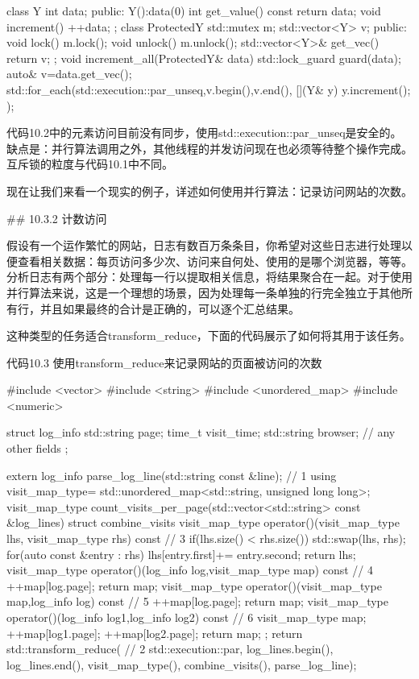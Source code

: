 \begin{cpp}
class Y{
  int data;
public:
  Y():data(0){}
  int get_value() const{
    return data;
  }
  void increment(){
    ++data;
  }
};
class ProtectedY{
  std::mutex m;
  std::vector<Y> v;
public:
  void lock(){
    m.lock();
  }
  void unlock(){
    m.unlock();
  }
  std::vector<Y>& get_vec(){
    return v;
  }
};
void increment_all(ProtectedY& data){
  std::lock_guard guard(data);
  auto& v=data.get_vec();
  std::for_each(std::execution::par_unseq,v.begin(),v.end(),
    [](Y& y){
      y.increment();
    });
}
\end{cpp}

代码10.2中的元素访问目前没有同步，使用std::execution::par\_unseq是安全的。缺点是：并行算法调用之外，其他线程的并发访问现在也必须等待整个操作完成。互斥锁的粒度与代码10.1中不同。

现在让我们来看一个现实的例子，详述如何使用并行算法：记录访问网站的次数。

## 10.3.2 计数访问

假设有一个运作繁忙的网站，日志有数百万条条目，你希望对这些日志进行处理以便查看相关数据：每页访问多少次、访问来自何处、使用的是哪个浏览器，等等。分析日志有两个部分：处理每一行以提取相关信息，将结果聚合在一起。对于使用并行算法来说，这是一个理想的场景，因为处理每一条单独的行完全独立于其他所有行，并且如果最终的合计是正确的，可以逐个汇总结果。

这种类型的任务适合transform\_reduce，下面的代码展示了如何将其用于该任务。

代码10.3 使用transform\_reduce来记录网站的页面被访问的次数

\begin{cpp}
#include <vector>
#include <string>
#include <unordered_map>
#include <numeric>

struct log_info {
  std::string page;
  time_t visit_time;
  std::string browser;
  // any other fields
};

extern log_info parse_log_line(std::string const &line); // 1
using visit_map_type= std::unordered_map<std::string, unsigned long long>;
visit_map_type
count_visits_per_page(std::vector<std::string> const &log_lines) {
  struct combine_visits {
    visit_map_type
    operator()(visit_map_type lhs, visit_map_type rhs) const { // 3
      if(lhs.size() < rhs.size())
        std::swap(lhs, rhs);
      for(auto const &entry : rhs) {
        lhs[entry.first]+= entry.second;
      }
      return lhs;
    }
    visit_map_type operator()(log_info log,visit_map_type map) const{ // 4
      ++map[log.page];
      return map;
    }
    visit_map_type operator()(visit_map_type map,log_info log) const{ // 5
      ++map[log.page];
      return map;
    }
    visit_map_type operator()(log_info log1,log_info log2) const{ // 6
      visit_map_type map;
      ++map[log1.page];
      ++map[log2.page];
      return map;
    }
  };
  return std::transform_reduce( // 2
    std::execution::par, log_lines.begin(), log_lines.end(),
    visit_map_type(), combine_visits(), parse_log_line);
}
\end{cpp}

